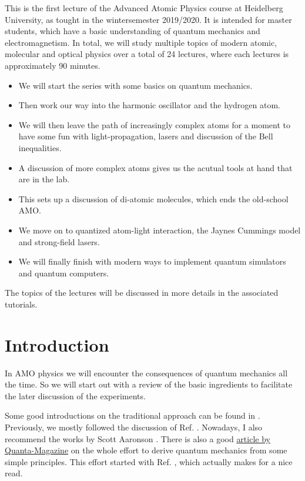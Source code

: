 This is the first lecture of the Advanced Atomic Physics course at Heidelberg University, as tought in the wintersemester 2019/2020.
It is intended for master students, which have a basic understanding of quantum mechanics and electromagnetism. In total, we will study multiple topics of modern atomic, molecular and optical physics over a total of 24 lectures, where each lectures is approximately 90 minutes. 
\begin{itemize}
\item We will start the series with some basics on quantum mechanics.
\item Then work our way into the harmonic oscillator and the hydrogen atom.
\item We will then leave the path of increasingly complex atoms for a moment to have some fun with light-propagation, lasers and discussion of the Bell inequalities.
\item A discussion of more complex atoms gives us the acutual tools at hand that are in the lab.
\item This sets up a discussion of di-atomic molecules, which ends the old-school AMO.
\item We move on to quantized atom-light interaction, the Jaynes Cummings model and strong-field lasers.
\item We will finally finish with modern ways to implement quantum simulators and quantum computers.
\end{itemize}

The topics of the lectures will be discussed in more details in the associated tutorials. 

\section{Introduction}
In AMO physics we will encounter the consequences of quantum mechanics all the time. So we will start out with a review of the basic ingredients to facilitate the later discussion of the experiments. 

Some good introductions on the traditional approach can be found in \cite{2002, 2006} \cite{1}\cite{2}. Previously, we mostly followed the discussion of Ref. \cite{2006}. Nowadays, I also recommend the works by Scott Aaronson \cite{quantum,holes}. There is also a good \href{https://www.quantamagazine.org/quantum-theory-rebuilt-from-simple-physical-principles-20170830/#}{article by Quanta-Magazine} on the whole effort to derive quantum mechanics from some simple principles. This effort started with Ref. \cite{axioms}, which actually makes for a nice read.

